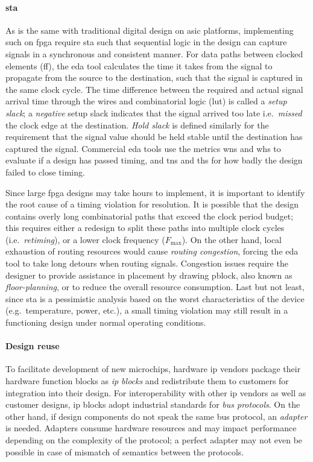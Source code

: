 \paragraph{\Ac{sta}} As is the same with traditional digital design on \ac{asic} platforms, implementing such on \ac{fpga} require \ac{sta} such that sequential logic in the design can capture signals in a synchronous and consistent manner.  For data paths between clocked elements (\ac{ff}), the \ac{eda} tool calculates the time it takes from the signal to propagate from the source to the destination, such that the signal is captured in the same clock cycle.  The time difference between the required and actual signal arrival time through the wires and combinatorial logic (\ac{lut}) is called a \emph{setup slack}; a \emph{negative} setup slack indicates that the signal arrived too late i.e.\ \emph{missed} the clock edge at the destination.  \emph{Hold slack} is defined similarly for the requirement that the signal value should be held stable until the destination has captured the signal.  Commercial \ac{eda} tools use the metrics \ac{wns} and \ac{whs} to evaluate if a design has passed timing, and \ac{tns} and \ac{ths} for how badly the design failed to close timing.

Since large \ac{fpga} designs may take hours to implement, it is important to identify the root cause of a timing violation for resolution.  It is possible that the design contains overly long combinatorial paths that exceed the clock period budget; this requires either a redesign to split these paths into multiple clock cycles (i.e.\ \emph{retiming}), or a lower clock frequency ($F_\text{max}$).  On the other hand, local exhaustion of routing resources would cause \emph{routing congestion}, forcing the \ac{eda} tool to take long detours when routing signals.  Congestion issues require the designer to provide assistance in placement by drawing \ac{pblock}, also known as \emph{floor-planning}, or to reduce the overall resource consumption.  Last but not least, since \ac{sta} is a pessimistic analysis based on the worst characteristics of the device (e.g.\ temperature, power, etc.), a small timing violation may still result in a functioning design under normal operating conditions.

\paragraph{Design reuse} To facilitate development of new microchips, hardware \ac{ip} vendors package their hardware function blocks as \emph{\ac{ip} blocks} and redistribute them to customers for integration into their design.  For interoperability with other \ac{ip} vendors as well as customer designs, \ac{ip} blocks adopt industrial standards for \emph{bus protocols}.  On the other hand, if design components do not speak the same bus protocol, an \emph{adapter} is needed.  Adapters consume hardware resources and may impact performance depending on the complexity of the protocol; a perfect adapter may not even be possible in case of mismatch of semantics between the protocols.


